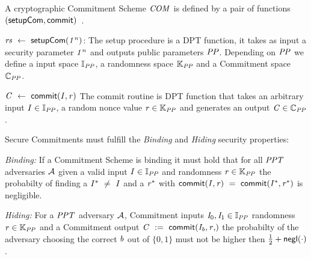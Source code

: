 \begin{definition}\label{def:pre:commitment}
    A cryptographic Commitment Scheme $\mathit{COM}$ is defined by a pair of functions $(\mathsf{setupCom}, \mathsf{commit})$~\cite{bunz2018bulletproofs}.
    \begin{asparaitem}
        \item $\mathit{rs} ~\leftarrow~ \mathsf{setupCom} (\mathit{1^n})$: The setup procedure is a DPT function, it takes as input a security parameter $\mathit{1^n}$ and outputs public parameters $\mathit{PP}$.
        Depending on $\mathit{PP}$ we define a input space $\mathbb{I}_{\mathit{PP}}$, a randomness space $\mathbb{K}_{\mathit{PP}}$ and a Commitment space $\mathbb{C}_{\mathit{PP}}$.
        \item $\mathit{C} ~\leftarrow~ \mathsf{commit}(\mathit{I}, \mathit{r})$ The commit routine is DPT function that takes an arbitrary input $\mathit{I} \in \mathbb{I}_{\mathit{PP}}$, a random nonce value $\mathit{r} \in \mathbb{K}_{\mathit{PP}}$ and
        generates an output $\mathit{C} \in \mathbb{C}_{\mathit{PP}}$.
    \end{asparaitem}

    Secure Commitments must fulfill the \emph{Binding} and \emph{Hiding} security properties:
    \begin{asparaitem}
        \item \textit{Binding:} If a Commitment Scheme is binding it must hold that for all $\mathit{PPT}$ adversaries $\mathcal{A}$ given a valid input $\mathit{I} \in \mathbb{I}_{\mathit{PP}}$
        and randomness $\mathit{r} \in \mathbb{K}_{\mathit{PP}}$ the probabilty of finding a $\mathit{I}^* ~\neq~ \mathit{I}$ and a $\mathit{r}^*$ with
        $\mathsf{commit}(\mathit{I}, \mathit{r}) ~=~ \mathsf{commit}(\mathit{I}^*, \mathit{r}^*)$ is negligible.
        \item \textit{Hiding:} For a $\mathit{PPT}$ adversary $\mathcal{A}$, Commitment inputs $\mathit{I}_0, \mathit{I}_1 \in \mathbb{I}_{\mathit{PP}}$ randomness $\mathit{r} \in
       \mathbb{K}_{\mathit{PP}}$ and a Commitment output $\varCommitment \opAssign \procCommit{\varInput_{\varB}, \varNonceAlt}$ the probabilty of the adversary choosing the correct $\mathit{b}$ out of $\{0,1\}$
        must not be higher then $\frac{1}{2} + \mathsf{negl}(\cdot)$.
    \end{asparaitem}
\end{definition}

